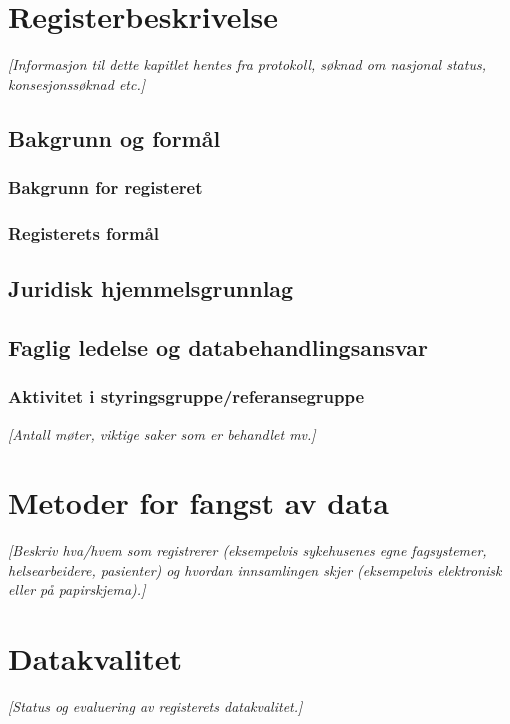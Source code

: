 \documentclass[norsk, a4paper, twocolumn]{report}
\newcommand{\guide}[1] {
	\textit{[\textcolor{guidegray}{#1}]}
	}
\begin{document}
\twocolumn




\chapter{Registerbeskrivelse}\label{cha:reg}
\guide{Informasjon til dette kapitlet hentes fra protokoll, søknad om nasjonal status, konsesjonssøknad etc.}


\section{Bakgrunn og formål}
\subsection{Bakgrunn for registeret}\label{sec:bak}
\subsection{Registerets formål}\label{sec:for}

\section{Juridisk hjemmelsgrunnlag}\label{cha:jur}

\section{Faglig ledelse og databehandlingsansvar}\label{cha:led}

\subsection{Aktivitet i styringsgruppe/referansegruppe}
\guide{Antall møter, viktige saker som er behandlet mv.}


\chapter{Metoder for fangst av data}
\guide{Beskriv hva/hvem som registrerer (eksempelvis sykehusenes egne
fagsystemer, helsearbeidere, pasienter) og hvordan innsamlingen skjer
(eksempelvis elektronisk eller på papirskjema).}




\chapter{Datakvalitet}\label{cha:kva}
\guide{Status og evaluering av registerets  datakvalitet.}
\end{document}
